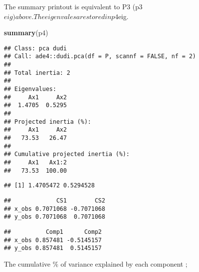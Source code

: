 \documentclass[]{article}
\newenvironment{Shaded}{\begin{snugshade}}{\end{snugshade}}
\newcommand{\KeywordTok}[1]{\textcolor[rgb]{0.13,0.29,0.53}{\textbf{#1}}}
\newcommand{\OperatorTok}[1]{\textcolor[rgb]{0.81,0.36,0.00}{\textbf{#1}}}
\newcommand{\NormalTok}[1]{#1}
\begin{document}
The summary printout is equivalent to P3
(p3\(eig) above. The eigenvales are stored in p4\)eig.

\begin{Shaded}
\begin{Highlighting}[]
\KeywordTok{summary}\NormalTok{(p4)}
\end{Highlighting}
\end{Shaded}

\begin{verbatim}
## Class: pca dudi
## Call: ade4::dudi.pca(df = P, scannf = FALSE, nf = 2)
## 
## Total inertia: 2
## 
## Eigenvalues:
##     Ax1     Ax2 
##  1.4705  0.5295 
## 
## Projected inertia (%):
##     Ax1     Ax2 
##   73.53   26.47 
## 
## Cumulative projected inertia (%):
##     Ax1   Ax1:2 
##   73.53  100.00
\end{verbatim}

\begin{Shaded}
\end{Shaded}

\begin{verbatim}
## [1] 1.4705472 0.5294528
\end{verbatim}

\begin{Shaded}
\end{Shaded}

\begin{verbatim}
##             CS1        CS2
## x_obs 0.7071068 -0.7071068
## y_obs 0.7071068  0.7071068
\end{verbatim}

\begin{Shaded}
\end{Shaded}

\begin{verbatim}
##          Comp1      Comp2
## x_obs 0.857481 -0.5145157
## y_obs 0.857481  0.5145157
\end{verbatim}

The cumulative \% of variance explained by each component ;
\end{document}
